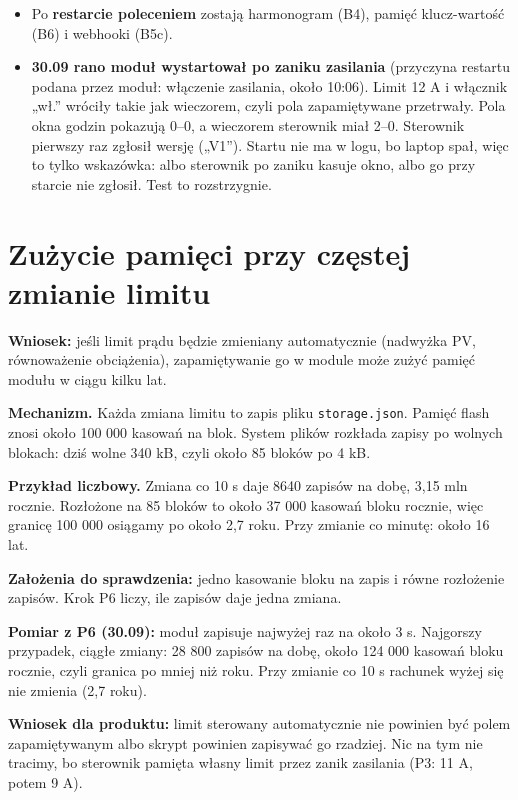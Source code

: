 \documentclass[11pt,a4paper]{article}
\begin{document}
\begin{itemize}
\item Po \textbf{restarcie poleceniem} zostają harmonogram (B4), pamięć klucz-wartość (B6) i webhooki (B5c).
\item \textbf{30.09 rano moduł wystartował po zaniku zasilania} (przyczyna restartu podana przez moduł: włączenie zasilania, około 10:06). Limit 12 A i włącznik „wł.” wróciły takie jak wieczorem, czyli pola zapamiętywane przetrwały. Pola okna godzin pokazują 0–0, a wieczorem sterownik miał 2–0. Sterownik pierwszy raz zgłosił wersję („V1”). Startu nie ma w logu, bo laptop spał, więc to tylko wskazówka: albo sterownik po zaniku kasuje okno, albo go przy starcie nie zgłosił. Test to rozstrzygnie.
\end{itemize}

\section*{Zużycie pamięci przy częstej zmianie limitu}

\textbf{Wniosek:} jeśli limit prądu będzie zmieniany automatycznie (nadwyżka PV, równoważenie obciążenia), zapamiętywanie go w module może zużyć pamięć modułu w ciągu kilku lat.


\textbf{Mechanizm.} Każda zmiana limitu to zapis pliku \texttt{storage.json}. Pamięć flash znosi około 100 000 kasowań na blok. System plików rozkłada zapisy po wolnych blokach: dziś wolne 340 kB, czyli około 85 bloków po 4 kB.


\textbf{Przykład liczbowy.} Zmiana co 10 s daje 8640 zapisów na dobę, 3,15 mln rocznie. Rozłożone na 85 bloków to około 37 000 kasowań bloku rocznie, więc granicę 100 000 osiągamy po około 2,7 roku. Przy zmianie co minutę: około 16 lat.


\textbf{Założenia do sprawdzenia:} jedno kasowanie bloku na zapis i równe rozłożenie zapisów. Krok P6 liczy, ile zapisów daje jedna zmiana.


\textbf{Pomiar z P6 (30.09):} moduł zapisuje najwyżej raz na około 3 s. Najgorszy przypadek, ciągłe zmiany: 28 800 zapisów na dobę, około 124 000 kasowań bloku rocznie, czyli granica po mniej niż roku. Przy zmianie co 10 s rachunek wyżej się nie zmienia (2,7 roku).


\textbf{Wniosek dla produktu:} limit sterowany automatycznie nie powinien być polem zapamiętywanym albo skrypt powinien zapisywać go rzadziej. Nic na tym nie tracimy, bo sterownik pamięta własny limit przez zanik zasilania (P3: 11 A, potem 9 A).
\end{document}
